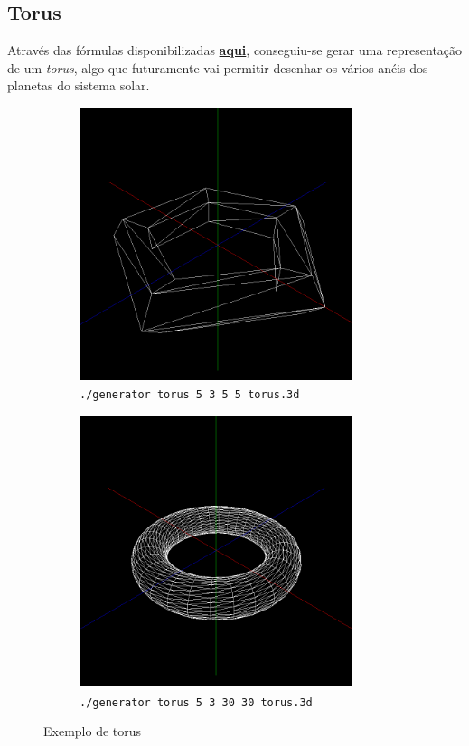 \documentclass[11pt,a4paper]{report}
\begin{document}
\subsection{Torus}
\vspace{0.5cm}
Através das fórmulas disponibilizadas \href{https://en.wikipedia.org/wiki/Torus#Geometry}{\textbf{aqui}}, conseguiu-se gerar uma representação de um \textit{torus}, algo que futuramente vai permitir desenhar os vários anéis dos planetas do sistema solar.
\vspace{1cm}
\begin{figure}[H]
\centering
\begin{subfigure}{0.5\textwidth}
  \centering
  \includegraphics[width = 8cm,height = 8cm]{torus1.png}
  \caption{\texttt{./generator torus 5 3 5 5 torus.3d}}
  \label{fig:torus1}
\end{subfigure}%
\begin{subfigure}{0.5\textwidth}
  \centering
  \includegraphics[width = 8cm,height = 8cm]{torus2.png}
  \caption{\texttt{./generator torus 5 3 30 30 torus.3d}}
  \label{fig:torus2}
\end{subfigure}
\caption{Exemplo de torus}
\label{fig:torus}
\end{figure}
\newpage
\end{document}
